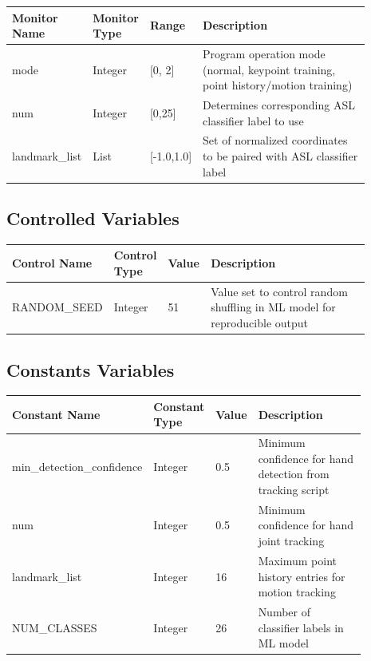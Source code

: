 \documentclass[12pt, titlepage]{article}
\begin{document}
\renewcommand{\arraystretch}{1.2}
\noindent \begin{tabularx}{\textwidth}{p{0.15\linewidth}|p{0.12\linewidth}|p{0.12\linewidth}|p{0.5\linewidth}}
\toprule
\textbf{Monitor Name} & \textbf{Monitor Type} & \textbf{Range} & \textbf{Description}\\
\midrule
mode & Integer & [0, 2] & Program operation mode (normal, keypoint training, point history/motion training)\\
\hline
num & Integer & [0,25] & Determines corresponding ASL classifier label to use\\
\hline
landmark\_list & List & [-1.0,1.0] & Set of normalized coordinates to be paired with ASL classifier label\\
\bottomrule
\end{tabularx}

\subsection{Controlled Variables}

\renewcommand{\arraystretch}{1.2}
\noindent \begin{tabularx}{\textwidth}{p{0.2\linewidth}|p{0.12\linewidth}|p{0.12\linewidth}|p{0.45\linewidth}}
\toprule
\textbf{Control Name} & \textbf{Control Type} & \textbf{Value} & \textbf{Description}\\
\midrule
RANDOM\_SEED & Integer & 51 & Value set to control random shuffling in ML model for reproducible output\\
\bottomrule
\end{tabularx}

\subsection{Constants Variables}

\renewcommand{\arraystretch}{1.2}
\noindent \begin{tabularx}{\textwidth}{p{0.28\linewidth}|p{0.12\linewidth}|p{0.08\linewidth}|p{0.4\linewidth}}
\toprule
\textbf{Constant Name} & \textbf{Constant Type} & \textbf{Value} & \textbf{Description}\\
\midrule
min\_detection\_confidence & Integer & 0.5 & Minimum confidence for hand detection from tracking script\\
\hline
num & Integer & 0.5 & Minimum confidence for hand joint tracking\\
\hline
landmark\_list & Integer & 16 & Maximum point history entries for motion tracking\\
\hline
NUM\_CLASSES & Integer & 26 & Number of classifier labels in ML model\\
\bottomrule
\end{tabularx}
\end{document}
